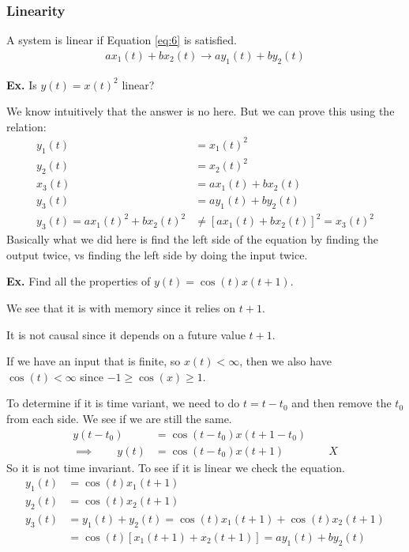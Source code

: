 \documentclass[12pt,letterpaper]{article} \usepackage{amsmath} \usepackage{graphicx} \usepackage[margin=1in]{geometry} \usepackage{longtable}  \usepackage{amssymb}
\begin{document}
	
	\subsubsection{Linearity}
	A system is linear if Equation \ref{eq:6} is satisfied.
	\begin{align}
		ax_1 (t) + bx_2 (t) \to ay_1 (t) + by_2(t)\label{eq:6}
	\end{align}
	
	\begin{mdframed}
		\textbf{Ex. } Is $y(t) = x(t)^2$ linear?
		
		We know intuitively that the answer is no here. But we can prove this using the relation:
		\begin{align*}
			y_1(t) &= x_1(t)^2\\
			y_2(t) &= x_2(t)^2\\
			x_3(t) &= ax_1(t) + bx_2(t)\\
			y_3(t) &= ay_1(t) + by_2(t)\\
			y_3(t) = ax_1(t)^2 + bx_2(t)^2 &\ne \left[ax_1(t) + bx_2(t)\right]^2 = x_3(t)^2
		\end{align*}
		Basically what we did here is find the left side of the equation by finding the output twice, vs finding the left side by doing the input twice. 
	\end{mdframed}
	
	\begin{mdframed}
		\textbf{Ex. } Find all the properties of $y(t) = \cos(t)x(t+1)$.
		
		We see that it is with memory since it relies on $t+1$.
		
		It is not causal since it depends on a future value $t+1$.
		
		If we have an input that is finite, so $x(t) < \infty$, then we also have $\cos(t) < \infty$ since $-1 \ge \cos(x)\ge 1$.
		
		To determine if it is time variant, we need to do $t = t-t_0$ and then remove the $t_0$ from each side. We see if we are still the same.
		\begin{align*}
			y(t-t_0) &= \cos(t-t_0)x(t+1-t_0)\\
			\implies \qquad  y(t) &= \cos(t-t_0) x(t+1) \qquad\qquad  X
		\end{align*}
		So it is not time invariant. 
		To see if it is linear we check the equation. 
		\begin{align*}
			y_1(t) &= \cos(t)x_1(t+1)\\
			y_2(t) &= \cos(t) x_2(t+1)\\
			y_3(t) &= y_1(t) + y_2(t) =  \cos(t)x_1(t+1) +  \cos(t)x_2(t+1) \\&= \cos(t) \left[x_1(t+1) + x_2(t+1)\right] = ay_1(t) + by_2(t)
		\end{align*}
	\end{mdframed}
	
\end{document}
